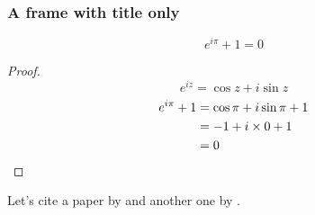 \documentclass{beamer}
\begin{document}
\begin{frame}
      \frametitle{A frame with title only}
      \begin{theorem}
            \[e^{i\pi}+1=0\]
            \begin{proof}
                  \begin{equation*}
                        e^{iz}=\cos{z}+i\sin{z}
                  \end{equation*}
                  \begin{align*}
                        e^{i\pi}+1 & \null=\cos\pi+i\sin\pi+1 \\
                                   & \null=-1+i\times0+1      \\
                                   & \null=0
                  \end{align*}
            \end{proof}
      \end{theorem}
      Let's cite a paper by \cite{amiot_2007_structure_triangulated_categories} and another one by \cite{bergh_jasso_thaule_2016_higher_angulations_local}.
\end{frame}
\end{document}
